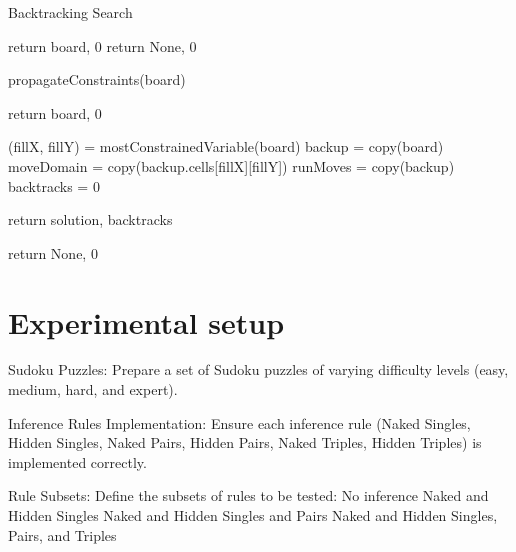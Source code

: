 \documentclass{article}
\begin{document}
\begin{algorithm}[h]
  
  \caption{Backtracking Search}
  \begin{algorithmic}
    \State return board, 0  
  \EndIf
    \State return None, 0   
  \EndIf
       
  \State propagateConstraints(board)

    \State return board, 0   
  \EndIf
  

  \State (fillX, fillY) = mostConstrainedVariable(board)
  \State backup = copy(board)
  \State moveDomain = copy(backup.cells[fillX][fillY])
  \State runMoves = copy(backup)
  \State backtracks = 0



      \EndIf



      \EndIf



      \State return solution, backtracks
      \EndIf

      \EndFor
  \State return None, 0           
    
         \end{algorithmic}
 \label{alg:Backtracking Search}
\end{algorithm}


 
 

\section{Experimental setup}
Sudoku Puzzles: Prepare a set of Sudoku puzzles of varying difficulty levels (easy, medium, hard, and expert).

Inference Rules Implementation: Ensure each inference rule (Naked Singles, Hidden Singles, Naked Pairs, Hidden Pairs, Naked Triples, Hidden Triples) is implemented correctly.

Rule Subsets: Define the subsets of rules to be tested:
No inference
Naked and Hidden Singles
Naked and Hidden Singles and Pairs
Naked and Hidden Singles, Pairs, and Triples
\end{document}
